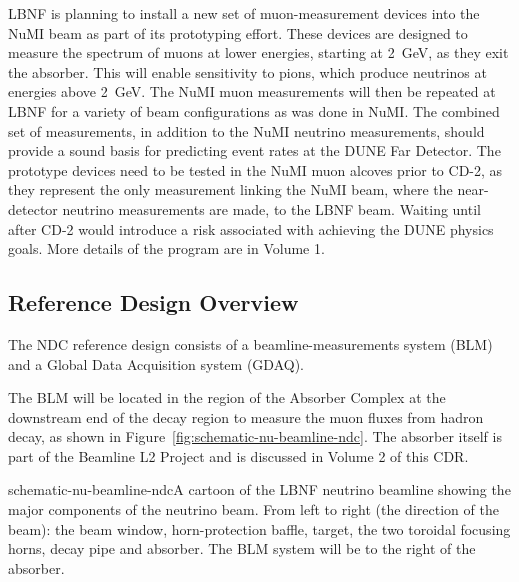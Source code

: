 
LBNF is planning to install a new set of muon-measurement devices into the 
NuMI beam as part of its prototyping effort. 
These devices are designed to measure the spectrum of muons at lower energies, starting at 2~GeV, as they exit the absorber. This will enable sensitivity to pions, which produce neutrinos at energies above 2~GeV. The NuMI muon measurements will then be repeated at LBNF for a variety of beam configurations as was done in NuMI. The combined set of measurements, in addition to the NuMI neutrino measurements, should provide a sound basis for predicting event rates at the DUNE Far Detector.
The prototype devices need to be tested in the NuMI muon alcoves prior to CD-2, as they represent the only measurement linking the NuMI beam, where the near-detector neutrino measurements are made, to the LBNF beam. Waiting until after CD-2 would introduce a risk associated with achieving the DUNE physics goals.  More details of the program are in Volume 1.

\subsection{Reference Design Overview}  %

The NDC reference design consists of a beamline-measurements system (BLM) and a Global Data Acquisition system (GDAQ).

The BLM will be located in the region of the Absorber Complex at the downstream end 
of the decay region to measure the muon fluxes from hadron decay, as shown in Figure~\ref{fig:schematic-nu-beamline-ndc}. The absorber itself is part of the Beamline L2 Project and is discussed in Volume 2 of this CDR. 

\begin{cdrfigure}{schematic-nu-beamline-ndc}{A cartoon of the LBNF neutrino beamline showing the major components of the neutrino beam. From left to right (the direction of the beam): the beam window, horn-protection baffle, target, the two toroidal focusing horns, decay pipe and absorber. The BLM system will be to the right of the absorber.}
\end{cdrfigure}

